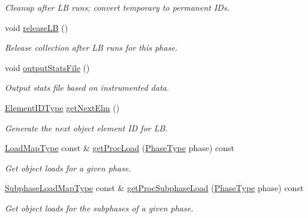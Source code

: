 \begin{DoxyCompactItemize}
\begin{DoxyCompactList}\small\item\em Cleanup after LB runs; convert temporary to permanent I\+Ds. \end{DoxyCompactList}\item 
void \hyperlink{structvt_1_1vrt_1_1collection_1_1balance_1_1_proc_stats_a7865efba4c984b1b77a93b5cd04dc861}{release\+LB} ()
\begin{DoxyCompactList}\small\item\em Release collection after LB runs for this phase. \end{DoxyCompactList}\item 
void \hyperlink{structvt_1_1vrt_1_1collection_1_1balance_1_1_proc_stats_a543211533c1c2c348137069e945432a5}{output\+Stats\+File} ()
\begin{DoxyCompactList}\small\item\em Output stats file based on instrumented data. \end{DoxyCompactList}\item 
\hyperlink{namespacevt_1_1vrt_1_1collection_1_1balance_a14c8d2c972f2913aa3f1636e5be0a120}{Element\+I\+D\+Type} \hyperlink{structvt_1_1vrt_1_1collection_1_1balance_1_1_proc_stats_aff0ecd6f0016ebd074b982caad107806}{get\+Next\+Elm} ()
\begin{DoxyCompactList}\small\item\em Generate the next object element ID for LB. \end{DoxyCompactList}\item 
\hyperlink{structvt_1_1vrt_1_1collection_1_1balance_1_1_proc_stats_aa810fd21680061ec5d50f6526f66be31}{Load\+Map\+Type} const  \& \hyperlink{structvt_1_1vrt_1_1collection_1_1balance_1_1_proc_stats_a58efd15cd33db3c5ce9ba8677feb486b}{get\+Proc\+Load} (\hyperlink{namespacevt_a46ce6733d5cdbd735d561b7b4029f6d7}{Phase\+Type} phase) const
\begin{DoxyCompactList}\small\item\em Get object loads for a given phase. \end{DoxyCompactList}\item 
\hyperlink{structvt_1_1vrt_1_1collection_1_1balance_1_1_proc_stats_ab2312e47e475143cf295d45cb2493f48}{Subphase\+Load\+Map\+Type} const  \& \hyperlink{structvt_1_1vrt_1_1collection_1_1balance_1_1_proc_stats_a56fe200ac4575869c60a02cfd628151d}{get\+Proc\+Subphase\+Load} (\hyperlink{namespacevt_a46ce6733d5cdbd735d561b7b4029f6d7}{Phase\+Type} phase) const
\begin{DoxyCompactList}\small\item\em Get object loads for the subphases of a given phase. \end{DoxyCompactList}\item 

\end{DoxyCompactItemize}
